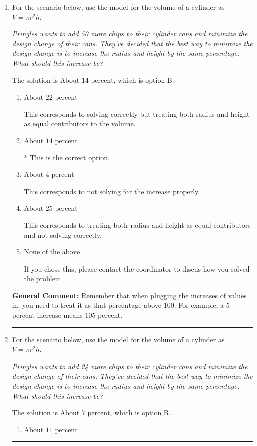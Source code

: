 \documentclass{extbook}[14pt]
\newcommand{\litem}[1]{\item #1

\rule{\textwidth}{0.4pt}}
\begin{document}
\begin{enumerate}\litem{
For the scenario below, use the model for the volume of a cylinder as $V = \pi r^2 h$.

\begin{center}
    \textit{ Pringles wants to add 50 \text{percent} more chips to their cylinder cans and minimize the design change of their cans. They've decided that the best way to minimize the design change is to increase the radius and height by the same percentage. What should this increase be? }
\end{center}
The solution is \( \text{About } 14 \text{ percent} \), which is option B.\begin{enumerate}[label=\Alph*.]
\item \( \text{About } 22 \text{ percent} \)

This corresponds to solving correctly but treating both radius and height as equal contributors to the volume.
\item \( \text{About } 14 \text{ percent} \)

* This is the correct option.
\item \( \text{About } 4 \text{ percent} \)

This corresponds to not solving for the increase properly.
\item \( \text{About } 25 \text{ percent} \)

This corresponds to treating both radius and height as equal contributors and not solving correctly.
\item \( \text{None of the above} \)

If you chose this, please contact the coordinator to discus how you solved the problem.
\end{enumerate}

\textbf{General Comment:} Remember that when plugging the increases of values in, you need to treat it as that percentage above 100. For example, a 5 percent increase means 105 percent.
}
\litem{
For the scenario below, use the model for the volume of a cylinder as $V = \pi r^2 h$.

\begin{center}
    \textit{ Pringles wants to add 24 \text{percent} more chips to their cylinder cans and minimize the design change of their cans. They've decided that the best way to minimize the design change is to increase the radius and height by the same percentage. What should this increase be? }
\end{center}
The solution is \( \text{About } 7 \text{ percent} \), which is option B.\begin{enumerate}[label=\Alph*.]
\item \( \text{About } 11 \text{ percent} \)


\end{enumerate}}
\end{enumerate}
\end{document}
